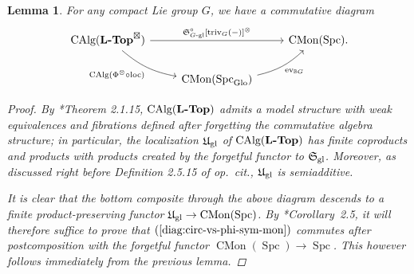\documentclass[reqno]{memo-l}
\theoremstyle{mythm}
\newtheorem{lemma}[thm]{Lemma}
\theoremstyle{definition}
\numberwithin{equation}{section}
\newcommand{\gl}{\textup{gl}}
\DeclareMathOperator{\ev}{ev}
\DeclareMathOperator{\Spc}{Spc}
\DeclareMathOperator{\CMon}{CMon}
\newcommand{\cat}[1]{\textbf{\textup{#1}}}
\newcommand{\triv}{{\textup{triv}}}
\DeclareMathOperator{\CAlg}{\textup{CAlg}}
\newcommand{\Glo}{\textup{Glo}}
\newcommand{\BGcat}[1]{\mathbb B{#1}}
\newcommand{\myS}{{{\mathfrak S\kern-.4pt}}}
\begin{document}
\begin{lemma}
    For any compact Lie group $G$, we have a commutative diagram
    \begin{equation}\label{diag:circ-vs-phi-sym-mon}
        \begin{tikzcd}
            \CAlg(\cat{$\cat{L}$-Top}^\boxtimes)\arrow[rr,"{\myS_\textup{$G$-gl}^\circ[\triv_G(-)]^\otimes}"]\arrow[dr,"\CAlg(\Phi^\otimes\circ\textup{loc})"', bend right=15pt] && \CMon(\Spc)\rlap.
            \\
            &\CMon(\Spc_{\Glo})\arrow[ur,"\ev_{\BGcat{G}}"', bend right=15pt]
        \end{tikzcd}
    \end{equation}
    \begin{proof}
        By \cite{schwede2018global}*{Theorem 2.1.15}, $\CAlg(\cat{$\cat{L}$-Top})$ admits a model structure with weak equivalences and fibrations defined after forgetting the commutative algebra structure; in particular, the localization $\mathfrak U_\gl$ of $\CAlg(\cat{$\cat{L}$-Top})$ has finite coproducts and products with products created by the forgetful functor to $\myS_\gl$. Moreover, as discussed right before Definition 2.5.15 of \emph{op.\ cit.}, $\mathfrak U_\gl$ is semiadditive.

        It is clear that the bottom composite through the above diagram descends to a finite product-preserving functor $\mathfrak U_\gl\to\CMon(\Spc)$. By \cite{Gepner-Groth-Nikolaus}*{Corollary~2.5}, it will therefore suffice to prove that $(\ref{diag:circ-vs-phi-sym-mon})$ commutes after postcomposition with the forgetful functor $\CMon(\Spc)\to\Spc$. This however follows immediately from the previous lemma.
    \end{proof}
\end{lemma}
\end{document}
